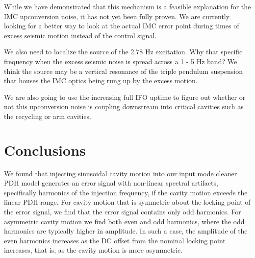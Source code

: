While we have demonstrated that this mechanism is a feasible explanation for the IMC upconversion noise, it has not yet been fully proven. We are currently looking for a better way to look at the actual IMC error point during times of excess seismic motion instead of the control signal. 

We also need to localize the source of the 2.78 Hz excitation. Why that specific frequency when the excess seismic noise is spread across a 1 - 5 Hz band? We think the source may be a vertical resonance of the triple pendulum suspension that houses the IMC optics being rung up by the excess motion.

We are also going to use the increasing full IFO uptime to figure out whether or not this upconversion noise is coupling downstream into critical cavities such as the recycling or arm cavities.

\section{Conclusions}

We found that injecting sinusoidal cavity motion into our input mode cleaner PDH model generates an error signal with non-linear spectral artifacts, specifically harmonics of the injection frequency, if the cavity motion exceeds the linear PDH range. For cavity motion that is symmetric about the locking point of the error signal, we find that the error signal contains only odd harmonics. For asymmetric cavity motion we find both even and odd harmonics, where the odd harmonics are typically higher in amplitude. In such a case, the amplitude of the even harmonics increases as the DC offset from the nominal locking point increases, that is, as the cavity motion is more asymmetric.

